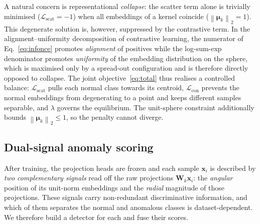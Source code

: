 \documentclass[times, review, 10pt]{elsarticle}
\newcommand{\norm}[1]{\left\lVert #1 \right\rVert}
\newcommand{\Lcross}{\mathcal{L}_{\mathrm{con}}}
\newcommand{\Lscat}{\mathcal{L}_{\mathrm{scat}}}
\newcommand{\xx}{\bm{x}}
\newcommand{\WW}{\bm{W}}
\newcommand{\mmu}{\bm{\mu}}
\begin{document}
A natural concern is representational \emph{collapse}: the scatter term alone is
trivially minimised ($\Lscat=-1$) when all embeddings of a kernel coincide
($\norm{\mmu_k}_2=1$). This degenerate solution is, however, suppressed by the
contrastive term. In the alignment--uniformity decomposition of contrastive
learning, the numerator of Eq.~\eqref{eq:infonce} promotes \emph{alignment} of
positives while the log-sum-exp denominator promotes \emph{uniformity} of the
embedding distribution on the sphere, which is maximised only by a spread-out
configuration and is therefore directly opposed to collapse. The joint
objective~\eqref{eq:total} thus realises a controlled balance: $\Lscat$ pulls
each normal class towards its centroid, $\Lcross$ prevents the normal embeddings
from degenerating to a point and keeps different samples separable, and
$\lambda$ governs the equilibrium. The unit-sphere constraint additionally
bounds $\norm{\mmu_k}_2\le 1$, so the penalty cannot diverge.

\subsection{Dual-signal anomaly scoring}
\label{subsec:detection}

After training, the projection heads are frozen and each sample $\xx_i$ is
described by \emph{two complementary signals} read off the raw projections
$\WW_k\xx_i$: the \emph{angular} position of its unit-norm embeddings and the
\emph{radial} magnitude of those projections. These signals carry
non-redundant discriminative information, and which of them separates the
normal and anomalous classes is dataset-dependent. We therefore build a
detector for each and fuse their scores.
\end{document}
